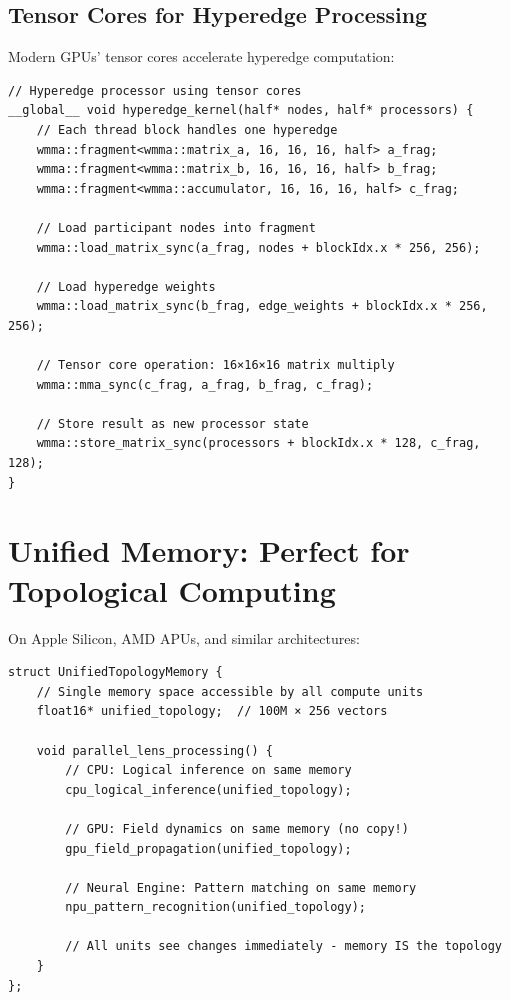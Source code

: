 \documentclass[12pt,a4paper,openany]{book} %
\begin{document}
\subsection{Tensor Cores for Hyperedge Processing}

Modern GPUs' tensor cores accelerate hyperedge computation:

\vspace{0.5em}
\begin{lstlisting}[style=cpp]
// Hyperedge processor using tensor cores
__global__ void hyperedge_kernel(half* nodes, half* processors) {
    // Each thread block handles one hyperedge
    wmma::fragment<wmma::matrix_a, 16, 16, 16, half> a_frag;
    wmma::fragment<wmma::matrix_b, 16, 16, 16, half> b_frag;
    wmma::fragment<wmma::accumulator, 16, 16, 16, half> c_frag;

    // Load participant nodes into fragment
    wmma::load_matrix_sync(a_frag, nodes + blockIdx.x * 256, 256);

    // Load hyperedge weights
    wmma::load_matrix_sync(b_frag, edge_weights + blockIdx.x * 256, 256);

    // Tensor core operation: 16×16×16 matrix multiply
    wmma::mma_sync(c_frag, a_frag, b_frag, c_frag);

    // Store result as new processor state
    wmma::store_matrix_sync(processors + blockIdx.x * 128, c_frag, 128);
}
\end{lstlisting}
\vspace{0.5em}

\section{Unified Memory: Perfect for Topological Computing}

On Apple Silicon, AMD APUs, and similar architectures:

\vspace{0.5em}
\begin{lstlisting}[style=cpp]
struct UnifiedTopologyMemory {
    // Single memory space accessible by all compute units
    float16* unified_topology;  // 100M × 256 vectors

    void parallel_lens_processing() {
        // CPU: Logical inference on same memory
        cpu_logical_inference(unified_topology);

        // GPU: Field dynamics on same memory (no copy!)
        gpu_field_propagation(unified_topology);

        // Neural Engine: Pattern matching on same memory
        npu_pattern_recognition(unified_topology);

        // All units see changes immediately - memory IS the topology
    }
};
\end{lstlisting}
\vspace{0.5em}
\end{document}

